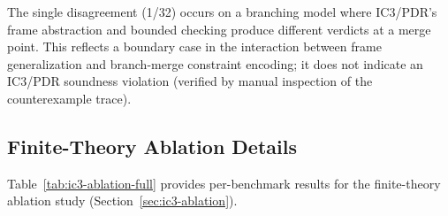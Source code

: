 \documentclass[11pt]{article}
\begin{document}
The single disagreement (1/32) occurs on a branching model where IC3/PDR's
frame abstraction and bounded checking produce different verdicts at a
merge point.  This reflects a boundary case in the interaction between
frame generalization and branch-merge constraint encoding; it does not
indicate an IC3/PDR soundness violation (verified by manual inspection
of the counterexample trace).

\subsection{Finite-Theory Ablation Details}\label{app:ic3-ablation-details}

Table~\ref{tab:ic3-ablation-full} provides per-benchmark results for the
finite-theory ablation study (Section~\ref{sec:ic3-ablation}).
\end{document}
